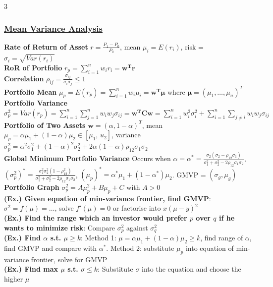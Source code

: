 \documentclass{article}
\begin{document}
{\begin{multicols*}{3}
\subsubsection*{\underline{Mean Variance Analysis}}
\textbf{Rate of Return of Asset} $r=\frac{P_1-P_0}{P_0}$, mean $\mu_i=E(r_i)$, risk = $\sigma_i=\sqrt{Var(r_i)}$\\
\textbf{RoR of Portfolio} $r_p=\sum_{i=1}^n w_ir_i=\boldsymbol{w^Tr}$\\
\textbf{Correlation} $\rho_{ij}=\frac{\sigma_{ij}}{\sigma_i \sigma_j}\leq 1$\\
\textbf{Portfolio Mean} $\mu_p=E(r_p)=\sum_{i=1}^nw_i\mu_i=\boldsymbol{w^T\mu}$ where $\boldsymbol{\mu}=(\mu_1,\dots,\mu_n)^T$\\
\textbf{Portfolio Variance} $\sigma_p^2=Var(r_p)=\sum_{i=1}^n\sum_{j=1}^nw_iw_j\sigma_{ij}=\boldsymbol{w^TCw}=\sum_{i=1}^nw_i^2\sigma_i^2+\sum_{i=1}^n\sum_{j\not=i}w_iw_j\sigma_{ij}$ \\
\textbf{Portfolio of Two Assets} $\boldsymbol{w}=(\alpha,1-\alpha)^T$, mean $\mu_p=\alpha\mu_1+(1-\alpha)\mu_2\in[\mu_1,\,u_2]$, variance $\sigma_p^2=\alpha^2\sigma_1^2+(1-\alpha)^2\sigma_2^2+2\alpha(1-\alpha)\rho_{12}\sigma_1\sigma_2$\\
\textbf{Global Minimum Portfolio Variance} Occurs when $\alpha=\alpha^*=\frac{\sigma_2(\sigma_2-\rho_{12}\sigma_1)}{\sigma_1^2+\sigma_2^2-2\rho_{12}\sigma_1\sigma_2}$, $(\sigma_p^2)^*=\frac{\sigma_1^2\sigma_2^2(1-\rho_{12}^2)}{\sigma_1^2+\sigma_2^2-2\rho_{12}\sigma_1\sigma_2}$, $(\mu_p)^*=\alpha^*\mu_1+(1-\alpha^*)\mu_2$. GMVP = $(\sigma_g,\mu_g)$\\
\textbf{Portfolio Graph} $\sigma_p^2=A\mu_p^2+B\mu_p+C$ with $A>0$\\
\textbf{(Ex.) Given equation of min-variance frontier, find GMVP}: $\sigma^2=f(\mu)=\dots$, solve $f'(\mu)=0$ or factorise into $x(\mu-y)^2$  \\
\textbf{(Ex.) Find the range which an investor would prefer $p$ over $q$ if he wants to minimize risk}: Compare $\sigma_p^2$ against $\sigma_q^2$\\
\textbf{(Ex.) Find $\alpha$ s.t. $\mu\geq k$}: Method 1: $\mu=\alpha\mu_1+(1-\alpha)\mu_2\geq k$, find range of $\alpha$, find GMVP and compare with $\alpha^*$. Method 2: substitute $\mu_p$ into equation of min-variance frontier, solve for GMVP\\
\textbf{(Ex.) Find max $\mu$ s.t. $\sigma\leq k$}: Substitute $\sigma$ into the equation and choose the higher $\mu$


\end{multicols*}}
\end{document}
